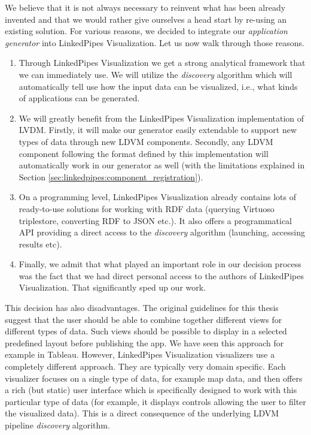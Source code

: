 We believe that it is not always necessary to reinvent what has been already invented and that we would rather give ourselves a head start by re-using an existing solution. For various reasons, we decided to integrate our \emph{application generator} into LinkedPipes Visualization. Let us now walk through those reasons.

\begin{enumerate}
\item Through LinkedPipes Visualization we get a strong analytical framework that we can immediately use. We will utilize the \emph{discovery} algorithm which will automatically tell use how the input data can be visualized, i.e., what kinds of applications can be generated.
\item We will greatly benefit from the LinkedPipes Visualization implementation of LVDM. Firstly, it will make our generator easily extendable to support new types of data through new LDVM components. Secondly, any LDVM component following the format defined by this implementation will automatically work in our generator as well (with the limitations explained in Section \ref{sec:linkedpipes:component_registration}).
\item On a programming level, LinkedPipes Visualization already contains lots of ready-to-use solutions for working with RDF data (querying Virtuoso triplestore, converting RDF to JSON etc.). It also offers a programmatical API providing a direct access to the \emph{discovery} algorithm (launching, accessing results etc).
\item Finally, we admit that what played an important role in our decision process was the fact that we had direct personal access to the authors of LinkedPipes Visualization. That significantly sped up our work.

\end{enumerate}
This decision has also disadvantages. The original guidelines for this thesis suggest that the user should be able to combine together different views for different types of data. Such views should be possible to display in a selected predefined layout before publishing the app. We have seen this approach for example in Tableau. However, LinkedPipes Visualization visualizers use a completely different approach. They are typically very domain specific. Each visualizer focuses on a single type of data, for example map data, and then offers a rich (but static) user interface which is specifically designed to work with this particular type of data (for example, it displays controls allowing the user to filter the visualized data). This is a direct consequence of the underlying LDVM pipeline \emph{discovery} algorithm.

